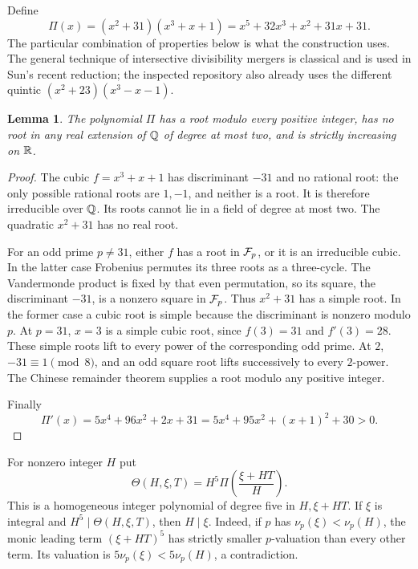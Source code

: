 \documentclass[11pt,a4paper]{article}
\newtheorem{lemma}[theorem]{Lemma}
\theoremstyle{definition}\newtheorem{definition}[theorem]{Definition}
\theoremstyle{remark}\newtheorem{remark}[theorem]{Remark}
\numberwithin{equation}{section}
\begin{document}
Define
\begin{equation}
 \Pi(x)=(x^2+31)(x^3+x+1)
       =x^5+32x^3+x^2+31x+31.
 \label{eq:pi}
\end{equation}
The particular combination of properties below is what the construction
uses. The general technique of intersective divisibility mergers is
classical and is used in Sun's recent reduction; the inspected repository
also already uses the different quintic $(x^2+23)(x^3-x-1)$.

\begin{lemma}\label{lem:pi}
The polynomial $\Pi$ has a root modulo every positive integer, has no
root in any real extension of $\mathbb Q$ of degree at most two, and is strictly
increasing on $\mathbb R$.
\end{lemma}
\begin{proof}
The cubic $f=x^3+x+1$ has discriminant $-31$ and no rational root:
the only possible rational roots are $1,-1$, and neither is a root.
It is therefore irreducible over $\mathbb Q$. Its roots cannot lie in a field
of degree at most two. The quadratic $x^2+31$ has no real root.

For an odd prime $p\ne31$, either $f$ has a root in $\mathcal F_p$, or it is
an irreducible cubic. In the latter case Frobenius permutes its three
roots as a three-cycle. The Vandermonde product is fixed by that even
permutation, so its square, the discriminant $-31$, is a nonzero square
in $\mathcal F_p$. Thus $x^2+31$ has a simple root. In the former case a cubic
root is simple because the discriminant is nonzero modulo $p$.
At $p=31$, $x=3$ is a simple cubic root, since $f(3)=31$ and
$f'(3)=28$. These simple roots lift to every power of the corresponding
odd prime. At $2$, $-31\equiv1\pmod8$, and an odd square root lifts
successively to every $2$-power. The Chinese remainder theorem supplies
a root modulo any positive integer.

Finally
\[
 \Pi'(x)=5x^4+96x^2+2x+31
        =5x^4+95x^2+(x+1)^2+30>0.
\]
\end{proof}

For nonzero integer $H$ put
\begin{equation}
 \Theta(H,\xi,T)=H^5\Pi\left(\frac{\xi+HT}{H}\right).
 \label{eq:theta}
\end{equation}
This is a homogeneous integer polynomial of degree five in $H,\xi+HT$.
If $\xi$ is integral and $H^5\mid\Theta(H,\xi,T)$, then $H\mid\xi$.
Indeed, if $p$ has $\nu_p(\xi)<\nu_p(H)$, the monic leading term
$(\xi+HT)^5$ has strictly smaller $p$-valuation than every other term.
Its valuation is $5\nu_p(\xi)<5\nu_p(H)$, a contradiction.
\end{document}
